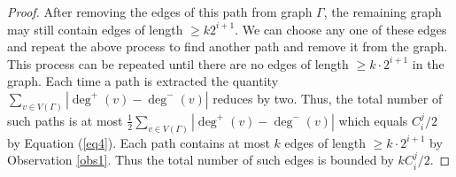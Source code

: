 \documentclass[oribibl]{llncs}
\begin{document}
\begin{proof}
After removing the edges of this path from graph $\Gamma$,
the remaining graph may still contain
edges of length $\ge k2^{i+1}$. We can choose any one of these edges and
repeat the above process to find another path and remove it from the graph.
This process can be repeated until there are no edges of length
$\ge k\cdot2^{i+1}$ in the graph. Each time a path is extracted the quantity
$\sum_{v\in{V(\Gamma)}}|\deg^+(v)-\deg^-(v)|$ reduces by two. Thus, the total
number of such paths is at most
$\frac{1}{2}\sum_{v\in{V(\Gamma)}}|\deg^+(v)-\deg^-(v)|$
which equals $C_i^j/2$ by Equation (\ref{eq4}).
Each path contains at most $k$ edges of length $\ge k\cdot2^{i+1}$
by Observation \ref{obs1}. Thus the total number of such edges is
bounded by $kC_i^j/2$. 
\end{proof}
\end{document}
